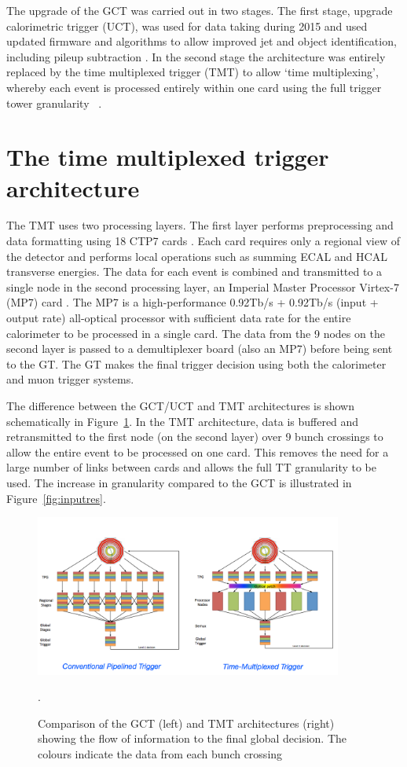 The upgrade of the GCT was carried out in two stages. The first stage,
upgrade calorimetric trigger (UCT), was used for data taking during 2015
and used updated firmware and algorithms to allow improved jet and object 
identification, including pileup subtraction \cite{uct}. In the second stage the 
architecture was entirely replaced by the time multiplexed trigger (TMT) 
to allow `time multiplexing', whereby each
event is processed entirely within one card using the full trigger tower granularity
~\cite{tmt}. 

\section{The time multiplexed trigger architecture}

The TMT uses two processing layers. The first layer performs
preprocessing and data formatting using 18 CTP7 cards \cite{mp7}. Each card requires
only a regional view of the detector and performs local operations such as summing 
ECAL and HCAL transverse energies. The data for each event is combined and transmitted to 
a single node in the second processing layer, an Imperial Master Processor Virtex-7 (MP7) card \cite{mp7}. 
The MP7 is a high-performance 0.92Tb/s + 0.92Tb/s (input + output rate) all-optical processor 
with sufficient data rate for the entire calorimeter to be processed in a single card. The data 
from the 9 nodes on the second layer is passed to a demultiplexer board (also an MP7) before
being sent to the GT. The GT makes the final trigger decision using both the calorimeter
and muon trigger systems.

The difference between the GCT/UCT and TMT architectures is shown schematically in Figure~\ref{tmux}. 
In the TMT architecture, data is buffered and retransmitted to the first node (on the second layer)
over 9 bunch crossings to allow the entire event to be processed on one card. This
removes the need for a large number of links between cards and allows the full TT 
granularity to be used. The increase in granularity compared to the GCT is
illustrated in Figure~\ref{fig:inputres}. 

\begin{figure}

\centering
    \includegraphics[width=0.9\textwidth]{./Figures/triggerUpgrade/tmux}
  \caption{Comparison of the GCT (left) and TMT architectures (right) showing the flow of information
  to the final global decision. The colours indicate the data from each bunch crossing~\cite{tmt}}.
  \label{tmux}
\end{figure}

